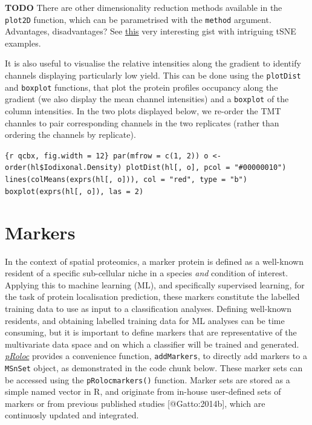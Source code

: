 \textbf{TODO} There are other dimensionality reduction methods available
in the \texttt{plot2D} function, which can be parametrised with the
\texttt{method} argument. Advantages, disadvantages? See
\href{https://gist.github.com/mikelove/74bbf5c41010ae1dc94281cface90d32}{this}
very interesting gist with intriguing tSNE examples.

It is also useful to visualise the relative intensities along the
gradient to identify channels displaying particularly low yield. This
can be done using the \texttt{plotDist} and \texttt{boxplot} functions,
that plot the protein profiles occupancy along the gradient (we also
display the mean channel intensities) and a \texttt{boxplot} of the
column intensities. In the two plots displayed below, we re-order the
TMT channles to pair corresponding channels in the two replicates
(rather than ordering the channels by replicate).

\texttt{\{r qcbx, fig.width = 12\} par(mfrow = c(1, 2)) o \textless{}- order(hl\$Iodixonal.Density) plotDist(hl{[}, o{]}, pcol = "\#00000010") lines(colMeans(exprs(hl{[}, o{]})), col = "red", type = "b") boxplot(exprs(hl{[}, o{]}), las = 2)}

\section{Markers}\label{markers}

In the context of spatial proteomics, a marker protein is defined as a
well-known resident of a specific sub-cellular niche in a species
\emph{and} condition of interest. Applying this to machine learning
(ML), and specifically supervised learning, for the task of protein
localisation prediction, these markers constitute the labelled training
data to use as input to a classification analyses. Defining well-known
residents, and obtaining labelled training data for ML analyses can be
time consuming, but it is important to define markers that are
representative of the multivariate data space and on which a classifier
will be trained and generated.
\emph{\href{http://bioconductor.org/packages/pRoloc}{pRoloc}} provides a
convenience function, \texttt{addMarkers}, to directly add markers to a
\texttt{MSnSet} object, as demonstrated in the code chunk below. These
marker sets can be accessed using the \texttt{pRolocmarkers()} function.
Marker sets are stored as a simple named vector in R, and originate from
in-house user-defined sets of markers or from previous published studies
{[}@Gatto:2014b{]}, which are continuosly updated and integrated.


